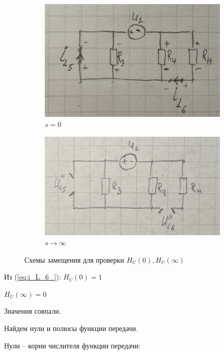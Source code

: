 \begin{figure}[H]
    \centering
    \begin{subfigure}[b]{0.45\textwidth}
        \includegraphics[width=\linewidth]{photo/circ_replaced_2}
        \caption{$ s = 0 $}
        \label{fig:s0}
    \end{subfigure}
    \hfill
    \begin{subfigure}[b]{0.45\textwidth}
        \includegraphics[width=\linewidth]{photo/circ_overlay_2}
        \caption{$ s \rightarrow \infty $ }
        \label{fig:si}
    \end{subfigure}
    \caption{Схемы замещения для проверки $ H_U(0), H_U(\infty) $}
\end{figure}

Из (\ref{eq:i_L_6_}): $ H_U(0) = 1 $

$ H_U(\infty) = 0 $

Значения совпали.

Найдем нули и полюсы функции передачи.

Нули -- корни числителя функции передачи:

